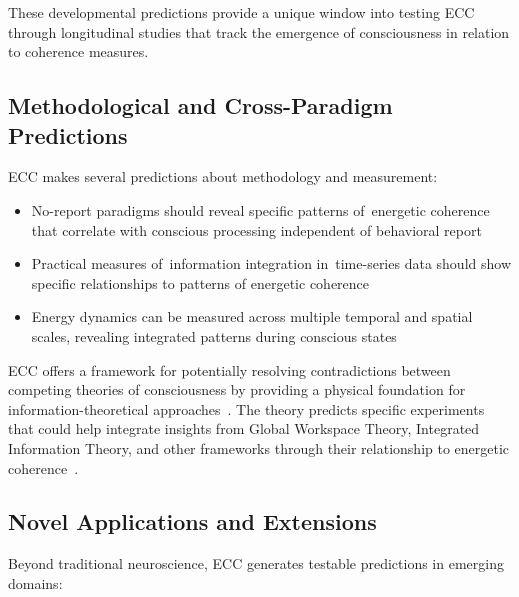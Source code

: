 These developmental predictions provide a unique window into testing ECC through longitudinal studies that track the emergence of consciousness in relation to coherence measures.

\subsection*{Methodological and Cross-Paradigm Predictions}

ECC makes several predictions about methodology and measurement:

\begin{itemize}
    \item {}No-report paradigms should reveal specific patterns of~energetic coherence that correlate with conscious processing independent of behavioral report~\cite{Tsuchiya2015, Koch2016, Michel2018}
    
    \item Practical measures of~information integration in~time-series data should show specific relationships to patterns of energetic coherence~\cite{Barrett2011, Casali2013}
    
    \item Energy dynamics can be measured across multiple temporal and spatial scales, revealing integrated patterns during conscious states~\cite{He2014, breakspear2005dynamics}
\end{itemize}

ECC offers a framework for potentially resolving contradictions between competing theories of consciousness by providing a physical foundation for information-theoretical approaches~\cite{Northoff2020, seth2021being}. The theory predicts specific experiments that could help integrate insights from Global Workspace Theory, Integrated Information Theory, and other frameworks through their relationship to energetic coherence~\cite{Dehaene2014, Tononi2015}.

\subsection*{Novel Applications and Extensions}

Beyond traditional neuroscience, ECC generates testable predictions in emerging domains:

